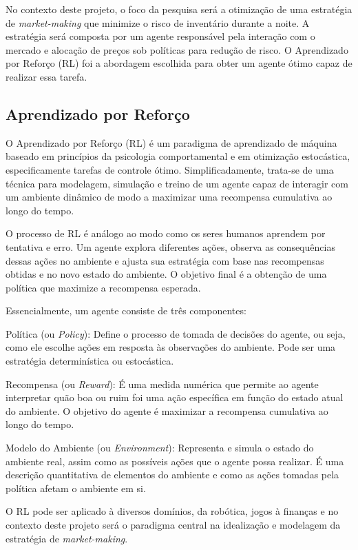 No contexto deste projeto, o foco da pesquisa será a otimização de uma estratégia de \textit{market-making} que minimize o risco de inventário durante a noite. A estratégia será composta por um agente responsável pela interação com o mercado e alocação de preços sob políticas para redução de risco. O Aprendizado por Reforço (RL) foi a abordagem escolhida para obter um agente ótimo capaz de realizar essa tarefa.

\subsection{Aprendizado por Reforço}
O Aprendizado por Reforço (RL) é um paradigma de aprendizado de máquina baseado em princípios da psicologia comportamental e em otimização estocástica, especificamente tarefas de controle ótimo. Simplificadamente, trata-se de uma técnica para modelagem, simulação e treino de um agente capaz de interagir com um ambiente dinâmico de modo a maximizar uma recompensa cumulativa ao longo do tempo.

O processo de RL é análogo ao modo como os seres humanos aprendem por tentativa e erro. Um agente explora diferentes ações, observa as consequências dessas ações no ambiente e ajusta sua estratégia com base nas recompensas obtidas e no novo estado do ambiente. O objetivo final é a obtenção de uma política que maximize a recompensa esperada.

Essencialmente, um agente consiste de três componentes:

Política (ou \textit{Policy}): Define o processo de tomada de decisões do agente, ou seja, como ele escolhe ações em resposta às observações do ambiente. Pode ser uma estratégia determinística ou estocástica.

Recompensa (ou \textit{Reward}): É uma medida numérica que permite ao agente interpretar quão boa ou ruim foi uma ação específica em função do estado atual do ambiente. O objetivo do agente é maximizar a recompensa cumulativa ao longo do tempo.

Modelo do Ambiente (ou \textit{Environment}): Representa e simula o estado do ambiente real, assim como as possíveis ações que o agente possa realizar. É uma descrição quantitativa de elementos do ambiente e como as ações tomadas pela política afetam o ambiente em si.

O RL pode ser aplicado à diversos domínios, da robótica, jogos à finanças e no contexto deste projeto será o paradigma central na idealização e modelagem da estratégia de \textit{market-making}.
